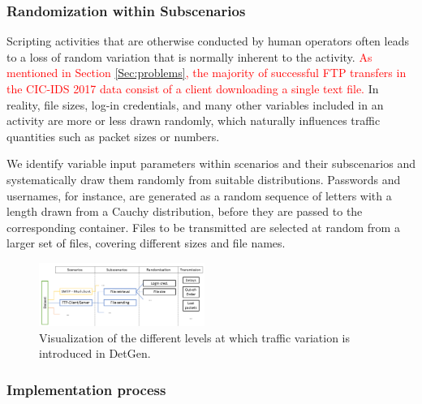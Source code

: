 \documentclass{article}
\begin{document}


\subsubsection*{Randomization within Subscenarios}\label{Sec:randomsubscen}

Scripting activities that are otherwise conducted by human operators often leads to a loss of random variation that is normally inherent to the activity.
\textcolor{red}{As mentioned in Section \ref{Sec:problems}, the majority of successful FTP transfers in the CIC-IDS 2017 data consist of a client downloading a single text file.} In reality, file sizes, log-in credentials, and many other variables included in an activity are more or less drawn randomly, which naturally influences traffic quantities such as packet sizes or numbers.

We identify variable input parameters within scenarios and their subscenarios and systematically draw them randomly from suitable distributions. Passwords and usernames, for instance, are generated as a random sequence of letters with a length drawn from a Cauchy distribution, before they are passed to the corresponding container. Files to be transmitted are selected at random from a larger set of files, covering different sizes and file names.

\begin{figure}
 \centering 
 \includegraphics[width=0.480\textwidth]{images/scenario_branching.PNG}
 \caption{Visualization of the different levels at which traffic variation is introduced in DetGen.}
 \label{Fig:branching}
\end{figure}

\subsubsection*{Implementation process}
\end{document}
